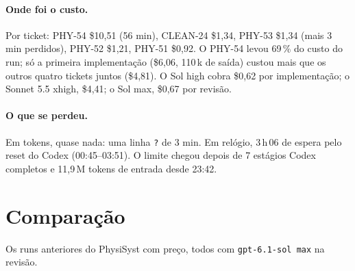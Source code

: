 \documentclass[11pt,a4paper]{article}
\begin{document}
\bigskip
\begin{center}
\end{center}

\paragraph{Onde foi o custo.} Por ticket: PHY-54 \$10,51 (56 min), CLEAN-24
\$1,34, PHY-53 \$1,34 (mais 3 min perdidos), PHY-52 \$1,21, PHY-51 \$0,92. O
PHY-54 levou 69\,\% do custo do run; só a primeira implementação (\$6,06,
110\,k de saída) custou mais que os outros quatro tickets juntos (\$4,81). O
Sol high cobra \$0,62 por implementação; o Sonnet 5.5 xhigh, \$4,41; o Sol max,
\$0,67 por revisão.

\paragraph{O que se perdeu.} Em tokens, quase nada: uma linha \texttt{?} de
3 min. Em relógio, 3\,h\,06 de espera pelo reset do Codex (00:45--03:51). O
limite chegou depois de 7 estágios Codex completos e 11,9\,M tokens de entrada
desde 23:42.

\section{Comparação}

Os runs anteriores do PhysiSyst com preço, todos com
\texttt{gpt-6.1-sol max} na revisão.
\end{document}
